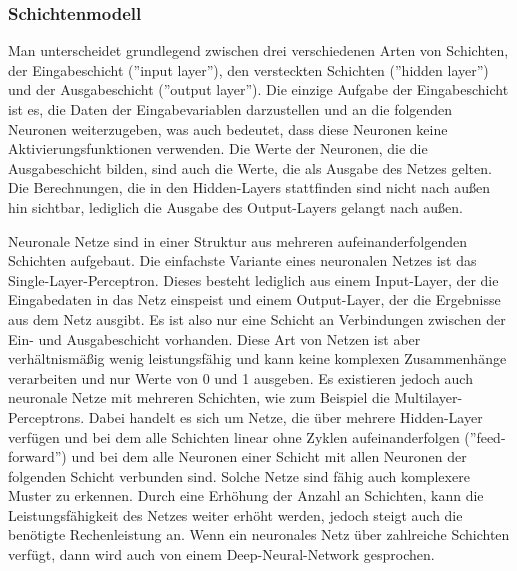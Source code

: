 \subsubsection{Schichtenmodell}\label{subsec:neuronen:schichtenmodell}
Man unterscheidet grundlegend zwischen drei verschiedenen Arten von Schichten, der Eingabeschicht (''input layer''), den versteckten Schichten (''hidden layer'') und der Ausgabeschicht (''output layer'').
Die einzige Aufgabe der Eingabeschicht ist es, die Daten der Eingabevariablen darzustellen und an die folgenden Neuronen weiterzugeben, was auch bedeutet, dass diese Neuronen keine Aktivierungsfunktionen verwenden.
Die Werte der Neuronen, die die Ausgabeschicht bilden, sind auch die Werte, die als Ausgabe des Netzes gelten.
Die Berechnungen, die in den Hidden-Layers stattfinden sind nicht nach außen hin sichtbar, lediglich die Ausgabe des Output-Layers gelangt nach außen.

\bigbreak\noindent
Neuronale Netze sind in einer Struktur aus mehreren aufeinanderfolgenden Schichten aufgebaut.
Die einfachste Variante eines neuronalen Netzes ist das Single-Layer-Perceptron. Dieses besteht lediglich aus einem Input-Layer, der die Eingabedaten in das Netz einspeist und einem Output-Layer, der die Ergebnisse aus dem Netz ausgibt.
Es ist also nur eine Schicht an Verbindungen zwischen der Ein- und Ausgabeschicht vorhanden.
Diese Art von Netzen ist aber verhältnismäßig wenig leistungsfähig und kann keine komplexen Zusammenhänge verarbeiten und nur Werte von 0 und 1 ausgeben.
Es existieren jedoch auch neuronale Netze mit mehreren Schichten, wie zum Beispiel die Multilayer-Perceptrons. Dabei handelt es sich um Netze, die über mehrere Hidden-Layer verfügen und bei dem alle Schichten linear ohne Zyklen aufeinanderfolgen (''feed-forward'') und bei dem alle Neuronen einer Schicht mit allen Neuronen der folgenden Schicht verbunden sind.
Solche Netze sind fähig auch komplexere Muster zu erkennen.
Durch eine Erhöhung der Anzahl an Schichten, kann die Leistungsfähigkeit des Netzes weiter erhöht werden, jedoch steigt auch die benötigte Rechenleistung an.
Wenn ein neuronales Netz über zahlreiche Schichten verfügt, dann wird auch von einem Deep-Neural-Network gesprochen.